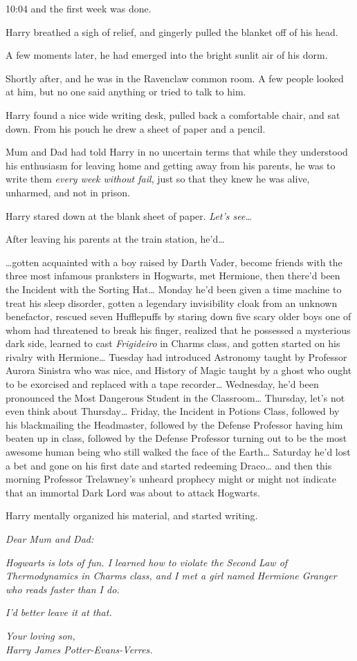 10:04 and the first week was done.

Harry breathed a sigh of relief, and gingerly pulled the blanket off of his 
head.

A few moments later, he had emerged into the bright sunlit air of his dorm.

Shortly after, and he was in the Ravenclaw common room. A few people looked at 
him, but no one said anything or tried to talk to him.

Harry found a nice wide writing desk, pulled back a comfortable chair, and sat 
down. From his pouch he drew a sheet of paper and a pencil.

Mum and Dad had told Harry in no uncertain terms that while they understood his 
enthusiasm for leaving home and getting away from his parents, he was to write 
them \emph{every week without fail}, just so that they knew he was alive, 
unharmed, and not in prison.

Harry stared down at the blank sheet of paper. \emph{Let's see{\ldots}}

After leaving his parents at the train station, he'd{\ldots}

{\ldots}gotten acquainted with a boy raised by Darth Vader, become friends with 
the three most infamous pranksters in Hogwarts, met Hermione, then there'd been 
the Incident with the Sorting Hat{\ldots} Monday he'd been given a time machine 
to treat his sleep disorder, gotten a legendary invisibility cloak from an 
unknown benefactor, rescued seven Hufflepuffs by staring down five scary older 
boys one of whom had threatened to break his finger, realized that he possessed 
a mysterious dark side, learned to cast \emph{Frigideiro} in Charms class, and 
gotten started on his rivalry with Hermione{\ldots} Tuesday had introduced 
Astronomy taught by Professor Aurora Sinistra who was nice, and History of 
Magic taught by a ghost who ought to be exorcised and replaced with a tape 
recorder{\ldots} Wednesday, he'd been pronounced the Most Dangerous Student in 
the Classroom{\ldots} Thursday, let's not even think about Thursday{\ldots} 
Friday, the Incident in Potions Class, followed by his blackmailing the 
Headmaster, followed by the Defense Professor having him beaten up in class, 
followed by the Defense Professor turning out to be the most awesome human 
being who still walked the face of the Earth{\ldots} Saturday he'd lost a bet 
and gone on his first date and started redeeming Draco{\ldots} and then this 
morning Professor Trelawney's unheard prophecy might or might not indicate that 
an immortal Dark Lord was about to attack Hogwarts.

Harry mentally organized his material, and started writing.

\emph{Dear Mum and Dad:}

\emph{Hogwarts is lots of fun. I learned how to violate the Second Law of 
Thermodynamics in Charms class, and I met a girl named Hermione Granger who 
reads faster than I do.}

\emph{I'd better leave it at that.}

\emph{Your loving son,\\
Harry James Potter-Evans-Verres.}
